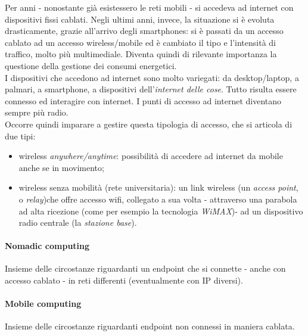 Per anni - nonostante già esistessero le reti mobili - si accedeva ad internet con dispositivi fissi cablati. Negli ultimi anni, invece, la situazione si è evoluta drasticamente, grazie all'arrivo degli smartphones: si è passati da un accesso cablato ad un accesso wireless/mobile ed è cambiato il tipo e l'intensità di traffico, molto più multimediale.
Diventa quindi di rilevante importanza la questione della gestione dei consumi energetici. \\
I dispositivi che accedono ad internet sono molto variegati: da desktop/laptop, a palmari, a smartphone, a dispositivi dell'\textit{internet delle cose}. Tutto risulta essere connesso ed interagire con internet. I punti di accesso ad internet diventano sempre più radio. \\
Occorre quindi imparare a gestire questa tipologia di accesso, che si articola di due tipi:
\begin{itemize}
	\item wireless \textit{anywhere/anytime}: possibilità di accedere ad internet da mobile anche se in movimento;
	\item wireless senza mobilità (rete universitaria): un link wireless (un \textit{access point}, o \textit{relay})che offre accesso wifi, collegato a sua volta - attraverso una parabola ad alta ricezione (come per esempio la tecnologia \textit{WiMAX})- ad un dispositivo radio centrale (la \textit{stazione base}).
\end{itemize}

\paragraph{Nomadic computing}
Insieme delle circostanze riguardanti un endpoint che si connette - anche con accesso cablato - in reti differenti (eventualmente con IP diversi).

\paragraph{Mobile computing}
Insieme delle circostanze riguardanti endpoint non connessi in maniera cablata. \\

